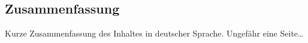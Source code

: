 \begin{otherlanguage}{ngerman}
	\chapter*{Zusammenfassung}
	Kurze Zusammenfassung des Inhaltes in deutscher Sprache. Ungefähr eine Seite\dots
\end{otherlanguage}
